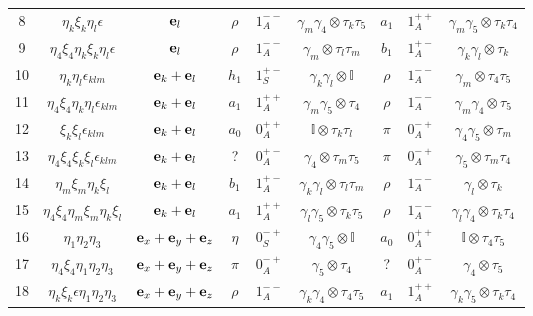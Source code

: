 \begin{table}
\begin{center}
\begin{tabular}{c|c|c|ccc|ccc}
8  & $\eta _k\xi _k \eta _l \epsilon$            & ${\bf e}_l$                     & $\rho$   & $1^{--}_A$ & $\gamma _m\gamma _4\otimes \tau _k \tau _5$  & $a_1$    & $1^{++}_A$ & $\gamma _m\gamma _5\otimes \tau _k\tau _4$ \\
9  & $\eta_4\xi_4\eta_k\xi_k\eta_l\epsilon$      & ${\bf e}_l$                     & $\rho$   & $1^{--}_A$ & $\gamma _m \otimes \tau _l\tau _m$           & $b_1$    & $1^{+-}_A$ & $\gamma _k\gamma _l \otimes \tau _k$ \\
10 & $\eta _k\eta _l \epsilon _{klm}$            & ${\bf e}_k+{\bf e}_l$           & $h_1$    & $1^{+-}_S$ & $\gamma _k\gamma _l\otimes \mathbb{I}$       & $\rho$   & $1^{--}_A$ & $\gamma _m\otimes \tau _4\tau _5$ \\
11 & $\eta_4\xi_4\eta _k\eta _l \epsilon _{klm}$ & ${\bf e}_k+{\bf e}_l$           & $a_1$    & $1^{++}_A$ & $\gamma _m\gamma _5\otimes \tau _4$          & $\rho$   & $1^{--}_A$ & $\gamma _m\gamma _4\otimes \tau _5$ \\
12 & $\xi _k\xi _l \epsilon _{klm}$              & ${\bf e}_k+{\bf e}_l$           & $a_0$    & $0^{++}_A$ & $\mathbb{I}\otimes \tau _k\tau _l$           & $\pi$    & $0^{-+}_A$ & $\gamma _4\gamma _5\otimes \tau _m$ \\
13 & $\eta_4\xi_4\xi _k\xi _l \epsilon _{klm}$   & ${\bf e}_k+{\bf e}_l$           & ?        & $0^{+-}_A$ & $\gamma _4\otimes \tau _m\tau _5$            & $\pi$    & $0^{-+}_A$ & $\gamma _5\otimes \tau _m\tau _4$ \\
14 & $\eta _m\xi _m\eta _k\xi _l$                & ${\bf e}_k+{\bf e}_l$           & $b_1$    & $1^{+-}_A$ & $\gamma _k\gamma _l\otimes \tau _l \tau _m$  & $\rho$   & $1^{--}_A$ & $\gamma _l\otimes \tau _k$ \\
15 & $\eta_4\xi_4\eta _m\xi _m\eta _k\xi _l$     & ${\bf e}_k+{\bf e}_l$           & $a_1$    & $1^{++}_A$ & $\gamma _l\gamma _5\otimes \tau _k \tau _5$  & $\rho$   & $1^{--}_A$ & $\gamma _l\gamma _4\otimes \tau _k\tau _4$ \\
16 & $\eta _1\eta _2\eta _3$                     & ${\bf e}_x+{\bf e}_y+{\bf e}_z$ & $\eta$   & $0^{-+}_S$ & $\gamma _4\gamma _5\otimes \mathbb{I}$       & $a_0$    & $0^{++}_A$ & $\mathbb{I}\otimes \tau _4\tau _5$ \\
17 & $\eta_4\xi_4\eta _1\eta _2\eta _3$          & ${\bf e}_x+{\bf e}_y+{\bf e}_z$ & $\pi$    & $0^{-+}_A$ & $\gamma _5\otimes \tau _4$                   & ?        & $0^{+-}_A$ & $\gamma _4\otimes \tau _5$ \\
18 & $\eta_k\xi_k\epsilon\eta _1\eta _2\eta _3$  & ${\bf e}_x+{\bf e}_y+{\bf e}_z$ & $\rho$   & $1^{--}_A$ & $\gamma _k\gamma _4\otimes \tau _4\tau _5$   & $a_1$    & $1^{++}_A$ & $\gamma _k\gamma _5\otimes \tau _k\tau _4$ \\

\end{tabular}
\end{center}
\end{table}
